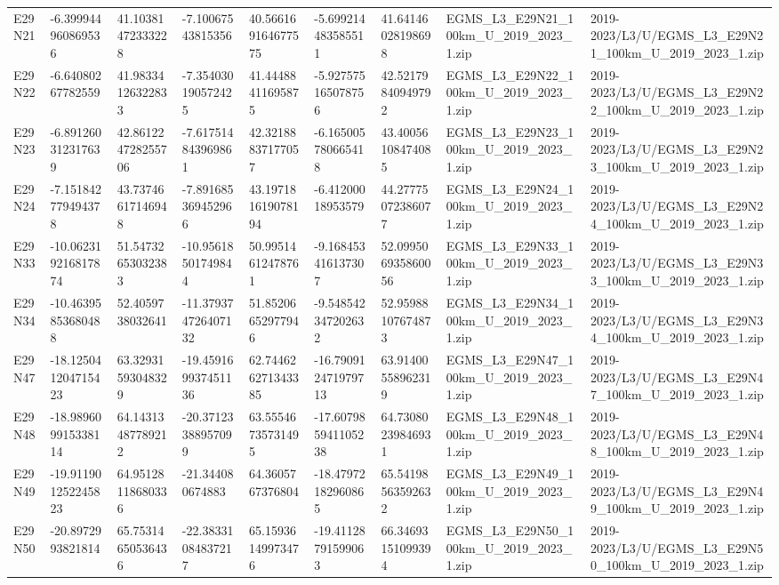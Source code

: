 \begin{landscape}
\begin{longtable}{lllllllll}
E29N21 & -6.399944960869536 & 41.10381472333228 & -7.10067543815356 & 40.566169164677575 & -5.699214483585511 & 41.64146028198698 & EGMS\_L3\_E29N21\_100km\_U\_2019\_2023\_1.zip & 2019-2023/L3/U/EGMS\_L3\_E29N21\_100km\_U\_2019\_2023\_1.zip \\
E29N22 & -6.64080267782559 & 41.98334126322833 & -7.354030190572425 & 41.44488411695875 & -5.927575165078756 & 42.52179840949792 & EGMS\_L3\_E29N22\_100km\_U\_2019\_2023\_1.zip & 2019-2023/L3/U/EGMS\_L3\_E29N22\_100km\_U\_2019\_2023\_1.zip \\
E29N23 & -6.891260312317639 & 42.861224728255706 & -7.617514843969861 & 42.32188837177057 & -6.165005780665418 & 43.40056108474085 & EGMS\_L3\_E29N23\_100km\_U\_2019\_2023\_1.zip & 2019-2023/L3/U/EGMS\_L3\_E29N23\_100km\_U\_2019\_2023\_1.zip \\
E29N24 & -7.151842779494378 & 43.73746617146948 & -7.891685369452966 & 43.197181619078194 & -6.41200018953579 & 44.27775072386077 & EGMS\_L3\_E29N24\_100km\_U\_2019\_2023\_1.zip & 2019-2023/L3/U/EGMS\_L3\_E29N24\_100km\_U\_2019\_2023\_1.zip \\
E29N33 & -10.062319216817874 & 51.54732653032383 & -10.95618501749844 & 50.99514612478761 & -9.168453416137307 & 52.099506935860056 & EGMS\_L3\_E29N33\_100km\_U\_2019\_2023\_1.zip & 2019-2023/L3/U/EGMS\_L3\_E29N33\_100km\_U\_2019\_2023\_1.zip \\
E29N34 & -10.46395853680488 & 52.4059738032641 & -11.379374726407132 & 51.85206652977946 & -9.548542347202632 & 52.95988107674873 & EGMS\_L3\_E29N34\_100km\_U\_2019\_2023\_1.zip & 2019-2023/L3/U/EGMS\_L3\_E29N34\_100km\_U\_2019\_2023\_1.zip \\
E29N47 & -18.125041204715423 & 63.32931593048329 & -19.459169937451136 & 62.744626271343385 & -16.790912471979713 & 63.91400558962319 & EGMS\_L3\_E29N47\_100km\_U\_2019\_2023\_1.zip & 2019-2023/L3/U/EGMS\_L3\_E29N47\_100km\_U\_2019\_2023\_1.zip \\
E29N48 & -18.989609915338114 & 64.14313487789212 & -20.37123388957099 & 63.55546735731495 & -17.607985941105238 & 64.73080239846931 & EGMS\_L3\_E29N48\_100km\_U\_2019\_2023\_1.zip & 2019-2023/L3/U/EGMS\_L3\_E29N48\_100km\_U\_2019\_2023\_1.zip \\
E29N49 & -19.911901252245823 & 64.95128118680336 & -21.344080674883 & 64.3605767376804 & -18.47972182960865 & 65.54198563592632 & EGMS\_L3\_E29N49\_100km\_U\_2019\_2023\_1.zip & 2019-2023/L3/U/EGMS\_L3\_E29N49\_100km\_U\_2019\_2023\_1.zip \\
E29N50 & -20.8972993821814 & 65.75314650536436 & -22.38331084837217 & 65.15936149973476 & -19.41128791599063 & 66.34693151099394 & EGMS\_L3\_E29N50\_100km\_U\_2019\_2023\_1.zip & 2019-2023/L3/U/EGMS\_L3\_E29N50\_100km\_U\_2019\_2023\_1.zip \\

\end{longtable}
\end{landscape}
